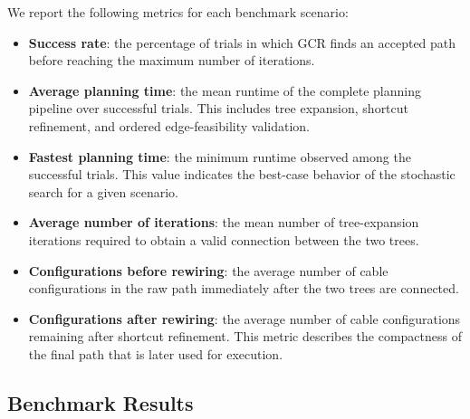 \documentclass{pas}
\begin{document}

We report the following metrics for each benchmark scenario:
\begin{itemize}
    \item \textbf{Success rate}: the percentage of trials in which GCR finds an accepted path before reaching the maximum number of iterations.
    
    \item \textbf{Average planning time}: the mean runtime of the complete planning pipeline over successful trials. This includes tree expansion, shortcut refinement, and ordered edge-feasibility validation.
    
    \item \textbf{Fastest planning time}: the minimum runtime observed among the successful trials. This value indicates the best-case behavior of the stochastic search for a given scenario.
    
    \item \textbf{Average number of iterations}: the mean number of tree-expansion iterations required to obtain a valid connection between the two trees.
    
    \item \textbf{Configurations before rewiring}: the average number of cable configurations in the raw path immediately after the two trees are connected.
    
    \item \textbf{Configurations after rewiring}: the average number of cable configurations remaining after shortcut refinement. This metric describes the compactness of the final path that is later used for execution.
\end{itemize}



\subsection{Benchmark Results}
\label{subsec:benchmark_results}
\end{document}
